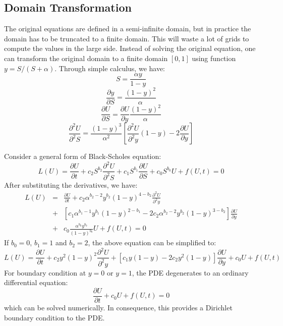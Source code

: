 \documentclass[12pt]{article}
\begin{document}
\subsection{Domain Transformation}
The original equations are defined in a semi-infinite domain, but in practice the domain has to be truncated to a finite domain. This will waste a lot of grids to compute the values in the large side. Instead of solving the original equation, one can transform the original domain to a finite domain $[0, 1]$ using function $y = S/(S+\alpha)$. Through simple calculus, we have:
\begin{equation*}
S = \frac{\alpha y}{1 - y}
\end{equation*}
\begin{equation*}
\frac{\partial y}{\partial S} = \frac{(1-y)^2}{\alpha}
\end{equation*}
\begin{equation*}
\frac{\partial U}{\partial S} = \frac{\partial U}{\partial y}\frac{(1-y)^2}{\alpha}
\end{equation*}
\begin{equation*}
\frac{\partial^2U}{\partial^2 S} = \frac{(1-y)^3}{\alpha^2}[\frac{\partial^2U}{\partial^2y}(1-y) - 2\frac{\partial U}{\partial y}]
\end{equation*}

Consider a general form of Black-Scholes equation:
\begin{equation*}
L(U) = \frac{\partial U}{\partial t} + c_2S^{b_2}\frac{\partial^2U}{\partial^2S} + c_1S^{b_1}\frac{\partial U}{\partial S} + c_0S^{b_0}U + f(U,t) = 0
\end{equation*}
After substituting the derivatives, we have:
\begin{eqnarray*}
L(U) &= &\frac{\partial U}{\partial t} + c_2\alpha^{b_2-2}y^{b_2}(1-y)^{4-b_2}\frac{\partial^2 U}{\partial^2 y} \\
&+& [c_1\alpha^{b_1-1}y^{b_1}(1-y)^{2-b_1} - 2c_2\alpha^{b_2-2}y^{b_2}(1-y)^{3-b_2}]\frac{\partial U}{\partial y} \\
&+& c_0\frac{\alpha^{b_0}y^{b_0}}{(1-y)^{b_0}}U + f(U,t) = 0
\end{eqnarray*}
If $b_0 = 0$, $b_1 = 1$ and $b_2 = 2$, the above equation can be simplified to:
\begin{equation}
L(U) = \frac{\partial U}{\partial t} + c_2y^2(1-y)^2\frac{\partial^2U}{\partial^2y} + [c_1y(1-y) - 2c_2y^2(1-y)]\frac{\partial U}{\partial y} + c_0U + f(U, t)
\end{equation}
For boundary condition at $y = 0$ or $y = 1$, the PDE degenerates to an ordinary differential equation:
\begin{equation}
\frac{\partial U}{\partial t} + c_0U + f(U, t) = 0
\end{equation}
which can be solved numerically. In consequence, this provides a Dirichlet boundary condition to the PDE.
\end{document}

